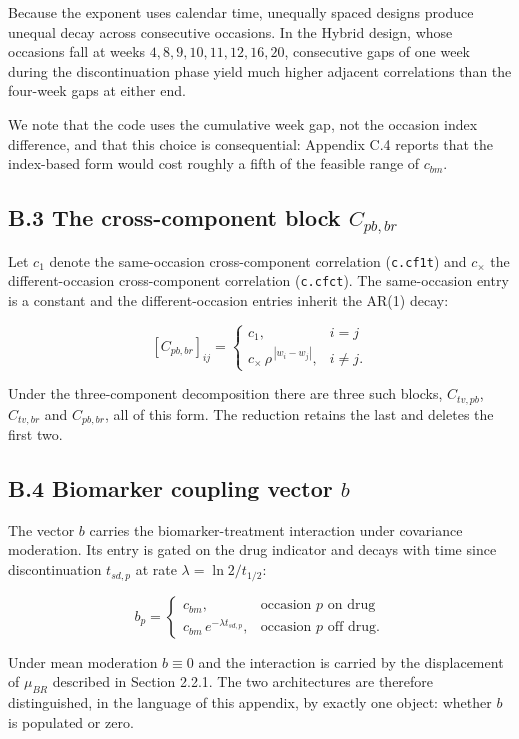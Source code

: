 \documentclass[
  11pt,
]{article}
\begin{document}
Because the exponent uses calendar time, unequally spaced designs
produce unequal decay across consecutive occasions. In the Hybrid
design, whose occasions fall at weeks \(4, 8, 9, 10, 11, 12, 16, 20\),
consecutive gaps of one week during the discontinuation phase yield
much higher adjacent correlations than the four-week gaps at either
end.

We note that the code uses the cumulative week gap, not the occasion
index difference, and that this choice is consequential: Appendix C.4
reports that the index-based form would cost roughly a fifth of the
feasible range of \(c_{bm}\).

\subsection{B.3 The cross-component block $C_{pb,br}$}

Let \(c_1\) denote the same-occasion cross-component correlation
(\texttt{c.cf1t}) and \(c_{\times}\) the different-occasion
cross-component correlation (\texttt{c.cfct}). The same-occasion
entry is a constant and the different-occasion entries inherit the
AR(1) decay:

\[
[C_{pb,br}]_{ij} =
\begin{cases}
c_1, & i = j\\
c_{\times}\,\rho^{\,|w_i - w_j|}, & i \neq j .
\end{cases}
\]

Under the three-component decomposition there are three such blocks,
\(C_{tv,pb}\), \(C_{tv,br}\) and \(C_{pb,br}\), all of this form. The
reduction retains the last and deletes the first two.

\subsection{B.4 Biomarker coupling vector $b$}

The vector \(b\) carries the biomarker-treatment interaction under
covariance moderation. Its entry is gated on the drug indicator and
decays with time since discontinuation \(t_{sd,p}\) at rate \(\lambda =
\ln 2 / t_{1/2}\):

\[
b_p =
\begin{cases}
c_{bm}, & \text{occasion } p \text{ on drug}\\
c_{bm}\,e^{-\lambda t_{sd,p}}, & \text{occasion } p \text{ off drug} .
\end{cases}
\]

Under mean moderation \(b \equiv 0\) and the interaction is carried by
the displacement of \(\mu_{BR}\) described in Section 2.2.1. The two
architectures are therefore distinguished, in the language of this
appendix, by exactly one object: whether \(b\) is populated or zero.
\end{document}
